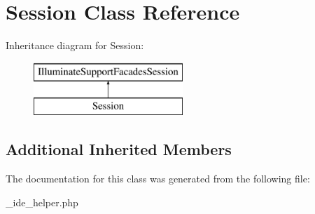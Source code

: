 \hypertarget{class_session}{}\section{Session Class Reference}
\label{class_session}
Inheritance diagram for Session\+:\begin{figure}[H]
\begin{center}
\leavevmode
\includegraphics[height=2.000000cm]{class_session}
\end{center}
\end{figure}
\subsection*{Additional Inherited Members}


The documentation for this class was generated from the following file\+:\begin{DoxyCompactItemize}
\item 
\+\_\+ide\+\_\+helper.\+php\end{DoxyCompactItemize}
